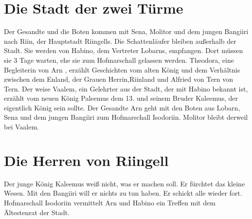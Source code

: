 \documentclass[12pt,a4paper,onecolumn,twoside,ngerman]{book}
\newcommand{\Tern}{Tern}
\newcommand{\Molitor}{Molitor}
\newcommand{\Sena}{Sena}
\newcommand{\Bangiri}{Bangiiri}
\newcommand{\Arwed}{Alfried von \Tern}
\newcommand{\Enland}{Enland}
\newcommand{\Schattenlaufer}{Schattenläufer}
\newcommand{\Lobarn}{Lobarn}
\newcommand{\Arn}{Arn}
\newcommand{\Theodora}{Theodora}
\newcommand{\Rhinland}{Riinland}
\newcommand{\Rhingell}{Riingell}
\newcommand{\Rhin}{Riin}
\newcommand{\Habino}{Habino}
\newcommand{\Valem}{Vaalem}
\newcommand{\Palemus}{Paleemus}
\newcommand{\Kalemus}{Kaleemus}
\newcommand{\Isodoriin}{Isodoriin}
\begin{document}
{\section{Die Stadt der zwei Türme}
Der Gesandte und die Boten kommen mit {\Sena}, {\Molitor} und  dem jungen {\Bangiri} nach {\Rhin}, der Hauptstadt \Rhingell{s}. Die  {\Schattenlaufer} bleiben außerhalb der Stadt.\linebreak
Sie werden von {\Habino}, dem Vertreter {\Lobarn}s, empfangen. Dort müssen sie 3 Tage warten, ehe sie zum Hofmarschall gelassen werden. {\Theodora}, eine Begleiterin von {\Arn} , erzählt Geschichten vom alten König und dem Verhältnis zwischen dem {\Enland}, der Grauen Herrin,{\Rhinland} und {\Arwed} von {\Tern}.\linebreak 
Der weise {\Valem}, ein Gelehrter aus der Stadt, der mit {\Habino} bekannt ist, erzählt vom neuen König {\Palemus} dem 13. und seinem Bruder {\Kalemus}, der eigentlich König sein sollte. Der Gesandte {\Arn} geht mit den Boten aus {\Lobarn}, {\Sena} und dem jungen {\Bangiri} zum Hofmarschall {\Isodoriin}.\linebreak
{\Molitor} bleibt derweil bei {\Valem}.

\section{Die Herren von \Rhingell}
Der junge König {\Kalemus} weiß nicht, was er machen soll. Er fürchtet das kleine Wesen. Mit den {\Bangiri} will er nichts zu tun haben. Er schickt alle wieder fort.\linebreak
Hofmarschall {\Isodoriin} vermittelt {\Arn} und {\Habino} ein Treffen mit dem Ältestenrat der Stadt.

}
\end{document}
